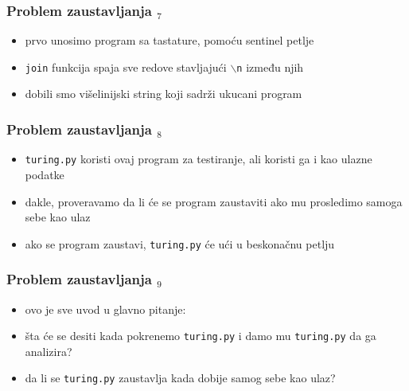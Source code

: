 \documentclass[utf8,compress]{beamer}
\begin{document}
\begin{frame}[fragile]
  \frametitle{Problem zaustavljanja $_7$}
  \begin{itemize}
    \item prvo unosimo program sa tastature, pomoću sentinel petlje
    \item \texttt{join} funkcija spaja sve redove stavljajući \texttt{$\backslash$n} između njih
    \item dobili smo višelinijski string koji sadrži ukucani program
  \end{itemize}
\end{frame}

\begin{frame}[fragile]
  \frametitle{Problem zaustavljanja $_8$}
  \begin{itemize}
    \item \texttt{turing.py} koristi ovaj program za testiranje, ali koristi ga i kao ulazne podatke
    \item dakle, proveravamo da li će se program zaustaviti ako mu prosledimo samoga sebe kao ulaz
    \item ako se program zaustavi, \texttt{turing.py} će ući u beskonačnu petlju
  \end{itemize}
\end{frame}

\begin{frame}[fragile]
  \frametitle{Problem zaustavljanja $_9$}
  \begin{itemize}
    \item ovo je sve uvod u glavno pitanje:
    \item šta će se desiti kada pokrenemo \texttt{turing.py} i damo mu \texttt{turing.py} da ga analizira?
    \item da li se \texttt{turing.py} zaustavlja kada dobije samog sebe kao ulaz?
  \end{itemize}
\end{frame}
\end{document}
